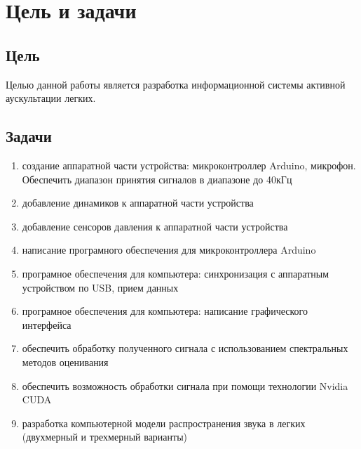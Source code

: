 \documentclass[../main.tex]{subfiles}
\begin{document}
\section{Цель и задачи}

\subsection{Цель}
Целью данной работы является разработка информационной системы активной аускультации легких.

\subsection{Задачи}
\begin{enumerate}
    \item создание аппаратной части устройства: микроконтроллер Arduino, микрофон. Обеспечить диапазон принятия сигналов в диапазоне до 40кГц
    \item добавление динамиков к аппаратной части устройства 
    \item добавление сенсоров давления к аппаратной части устройства 
    \item написание програмного обеспечения для микроконтроллера Arduino
    \item програмное обеспечения для компьютера: синхронизация с аппаратным устройством по USB, прием данных
    \item програмное обеспечения для компьютера: написание графического интерфейса
    \item обеспечить обработку полученного сигнала с использованием спектральных методов оценивания
    \item обеспечить возможность обработки сигнала при помощи технологии Nvidia CUDA
    \item разработка компьютерной модели распространения звука в легких (двухмерный и трехмерный варианты)
\end{enumerate}
\newpage
\end{document}

